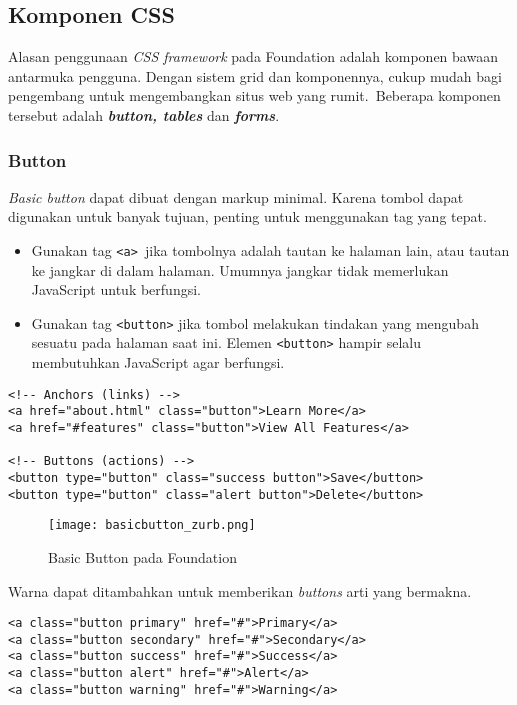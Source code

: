 \begin{enumerate}
\subsection{Komponen CSS}
\label{subs:css_zurb}
Alasan penggunaan \textit{CSS framework} pada Foundation adalah komponen bawaan antarmuka pengguna. Dengan sistem grid dan komponennya, cukup mudah bagi pengembang untuk mengembangkan situs web yang rumit.~\cite{zurb:15:introfoundation}Beberapa komponen tersebut adalah \textit{\textbf{button, tables}} dan \textit{\textbf{forms}}.\cite{zurbfoundation:17}

\subsubsection{Button}
\label{sssec:css_1}
\textit{Basic button} dapat dibuat dengan markup minimal. Karena tombol dapat digunakan untuk banyak tujuan, penting untuk menggunakan tag yang tepat.
\begin{itemize}
  \item Gunakan tag \texttt{<a> }jika tombolnya adalah tautan ke halaman lain, atau tautan ke jangkar di dalam halaman. Umumnya jangkar tidak memerlukan JavaScript untuk berfungsi.
  \item Gunakan tag \texttt{<button>} jika tombol melakukan tindakan yang mengubah sesuatu pada halaman saat ini. Elemen \texttt{<button>} hampir selalu membutuhkan JavaScript agar berfungsi. \cite{zurbfoundation:17}
\end{itemize}\cite{zurbfoundation:17}

\begin{lstlisting}[frame=single] 
<!-- Anchors (links) -->
<a href="about.html" class="button">Learn More</a>
<a href="#features" class="button">View All Features</a>

<!-- Buttons (actions) -->
<button type="button" class="success button">Save</button>
<button type="button" class="alert button">Delete</button>
\end{lstlisting}

\begin{figure} [H]
	\centering  
	\texttt{[image: basicbutton\_zurb.png]}  
	\caption{Basic Button pada Foundation}
	\label{fig:gridbasic_zurb} 
\end{figure}

Warna dapat ditambahkan untuk memberikan \textit{buttons} arti yang bermakna.
\begin{lstlisting}[frame=single] 
<a class="button primary" href="#">Primary</a>
<a class="button secondary" href="#">Secondary</a>
<a class="button success" href="#">Success</a>
<a class="button alert" href="#">Alert</a>
<a class="button warning" href="#">Warning</a>
\end{lstlisting}


\end{enumerate}
